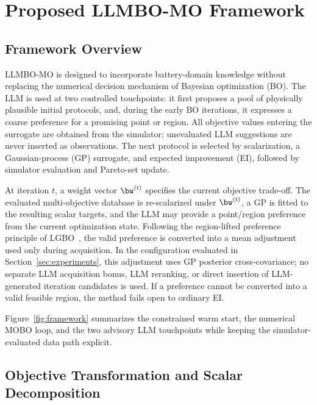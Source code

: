 \section{Proposed LLMBO-MO Framework}
\label{sec:method}

\subsection{Framework Overview}

LLMBO-MO is designed to incorporate battery-domain knowledge without replacing
the numerical decision mechanism of Bayesian optimization (BO). The LLM is used
at two controlled touchpoints: it first proposes a pool of physically plausible
initial protocols, and, during the early BO iterations, it expresses a coarse
preference for a promising point or region. All objective values entering the
surrogate are obtained from the simulator; unevaluated LLM suggestions are
never inserted as observations. The next protocol is selected by scalarization,
a Gaussian-process (GP) surrogate, and expected improvement (EI), followed by
simulator evaluation and Pareto-set update.

At iteration $t$, a weight vector $\bw^{(t)}$ specifies the current objective
trade-off. The evaluated multi-objective database is re-scalarized under
$\bw^{(t)}$, a GP is fitted to the resulting scalar targets, and the LLM may
provide a point/region preference from the current optimization state. Following
the region-lifted preference principle of LGBO~\cite{ref16}, the valid
preference is converted into a mean adjustment used only during acquisition.
In the configuration evaluated in Section~\ref{sec:experiments}, this adjustment
uses GP posterior cross-covariance; no separate LLM acquisition bonus, LLM
reranking, or direct insertion of LLM-generated iteration candidates is used.
If a preference cannot be converted into a valid feasible region, the method
fails open to ordinary EI.

Figure~\ref{fig:framework} summarizes the constrained warm start, the
numerical MOBO loop, and the two advisory LLM touchpoints while keeping the
simulator-evaluated data path explicit.


\subsection{Objective Transformation and Scalar Decomposition}

